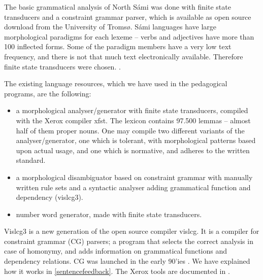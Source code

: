 \documentclass[11pt]{article}
\begin{document}
The basic grammatical analysis of North Sámi was done with finite state transducers and a constraint grammar parser, which is available as open source download from the University of Tromsø. Sámi languages have large morphological paradigms for each lexeme -- verbs and adjectives have more than 100 inflected forms. Some of the paradigm members have a very low text frequency, and there is not that much text electronically available. Therefore finite state transducers were chosen. \cite{Trosterud:07}.  

The existing language resources, which we have used in the pedagogical programs, are the following:

\begin{itemize}
\item a morphological analyser/generator with finite state transducers, compiled with the Xerox compiler xfst.  The lexicon contains 97.500 lemmas -- almost half of them proper nouns. One may compile two different variants of the analyser/generator, one which is tolerant, with morphological patterns based upon actual usage, and one which is normative, and adheres to the written standard. 
\item a morphological disambiguator based on constraint grammar with manually written rule sets and a syntactic analyser adding grammatical function and dependency (vislcg3). 
\item number word generator, made with finite state transducers.
\end{itemize}

Vislcg3 is a new generation of the open source compiler vislcg. It is a compiler for  constraint grammar (CG) parsers; a program that selects the correct analysis in case of homonymy, and adds information on grammatical functions and dependency relations. CG was launched in the early 90'ies \cite{Karlsson:95}. We have explained how it works in \ref{sentencefeedback}. The Xerox tools are documented in \cite{BeesleyKarttunen:03}. 


\end{document}
